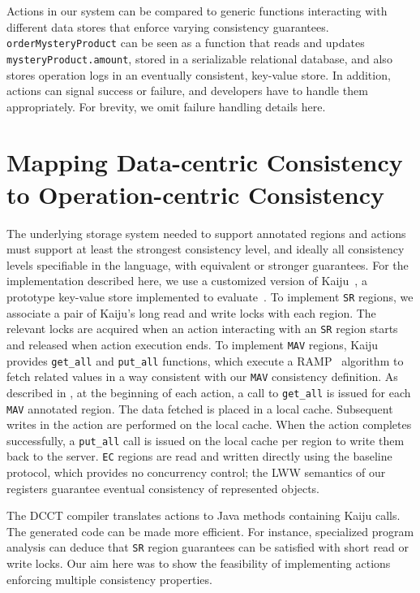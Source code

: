 \documentclass[numbers]{sigplanconf}
\begin{document}
Actions in our system can be compared to generic functions interacting
with different data stores that enforce varying consistency guarantees.
\texttt{orderMysteryProduct} can be seen as a function that
reads and updates \texttt{mysteryProduct.amount}, stored in a
serializable relational database, and also stores operation logs in an eventually consistent,
key-value store. In addition, actions can signal success
or failure, and developers have to handle them appropriately. For brevity, we
omit failure handling details here.

\section{Mapping Data-centric Consistency to Operation-centric Consistency}
\label{sec:underlyingsys}
The underlying storage system needed to support annotated regions and actions must
support at least the strongest consistency level, and ideally all consistency
levels specifiable in the language, with equivalent or stronger
guarantees. For the implementation described here, we use a customized
version of Kaiju~\cite{kaiju}, a prototype key-value store implemented to
evaluate~\cite{bailis2014scalable}. To implement \texttt{SR} regions, we
associate a pair of Kaiju's long read and write locks with each region. 
The relevant locks are acquired when an action interacting with an \texttt{SR}
region starts and released when action execution ends. 
To implement \texttt{MAV} regions, Kaiju provides
\texttt{get\_all} and \texttt{put\_all} functions, which execute a
RAMP~\cite{bailis2014scalable} algorithm
to fetch related values in a way consistent with our \texttt{MAV} consistency
definition. As described in \cite{bailis2014scalable}, at the beginning of
each action, a call to
\texttt{get\_all} is issued for each \texttt{MAV} annotated region.
The data fetched
is placed in a local cache. Subsequent writes in the action are performed on
the local cache. When the action completes successfully, a %
\texttt{put\_all} call is issued on the local cache per region to write them back to the server. 
%
\texttt{EC} regions are read and written directly using the baseline protocol, 
which provides no concurrency control; the LWW semantics of our registers guarantee
eventual consistency of represented objects. 

The DCCT compiler translates actions to Java methods containing Kaiju calls.
The generated code can be made more efficient. For instance, specialized 
program analysis can deduce that  \texttt{SR}  region guarantees can be satisfied 
with short read or write locks. Our aim here
was to show the feasibility of implementing actions enforcing multiple
consistency properties.
\end{document}
